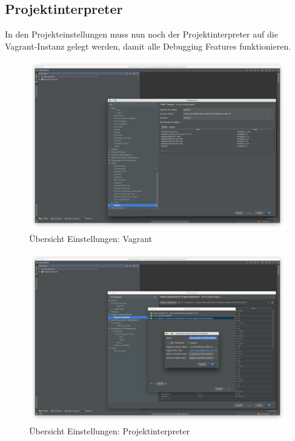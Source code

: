 \subsection{Projektinterpreter}
In den Projekteinstellungen muss nun noch der Projektinterpreter auf die Vagrant-Instanz gelegt werden, damit alle Debugging Features funktionieren.
\begin{figure}[H]
	\centering
	\includegraphics[width=0.8\linewidth]{fig/vagrant_settings}
	\caption{Übersicht Einstellungen: Vagrant}
	\label{fig:sd:vagrant-settings}
\end{figure}
\begin{figure}[H]
	\centering
	\includegraphics[width=0.8\linewidth]{fig/project_interpreter_detail}
	\caption{Übersicht Einstellungen: Projektinterpreter}
	\label{fig:sd:project-interpreter-detail}
\end{figure}


